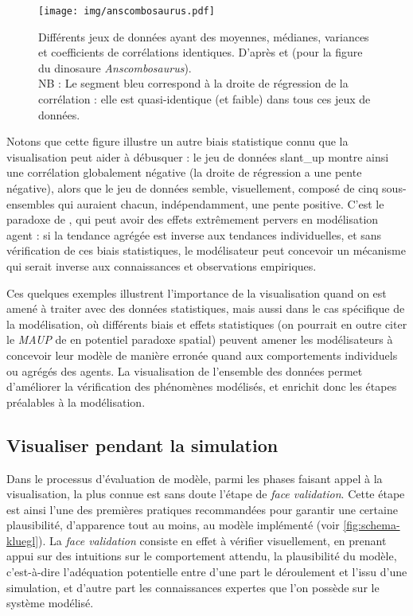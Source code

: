 \documentclass[a4paper, 12pt]{article}
\begin{document}
\begin{figure}[H]
	\centering
	\texttt{[image: img/anscombosaurus.pdf]}
	\caption{Différents jeux de données ayant des moyennes, médianes, variances et coefficients de corrélations identiques. D'après \textcite{matejka_same_2017} et \textcite{cairo_download_2016} (pour la figure du dinosaure \og \textit{Anscombosaurus}\fg{}).\\
	NB : Le segment bleu correspond à la droite de régression de la corrélation : elle est quasi-identique (et faible) dans tous ces jeux de données.}
	\label{fig:anscombosaurus}
\end{figure}

Notons que cette figure illustre un autre biais statistique connu que la visualisation peut aider à débusquer : le jeu de données \og \textsf{slant\_up}\fg{} montre ainsi une corrélation globalement négative (la droite de régression a une pente négative), alors que le jeu de données semble, visuellement, composé de cinq sous-ensembles qui auraient chacun, indépendamment, une pente positive.
C'est le paradoxe de \textcite{simpson_interpretation_1951}, qui peut avoir des effets extrêmement pervers en modélisation agent : si la tendance agrégée est inverse aux tendances individuelles, et sans vérification de ces biais statistiques, le modélisateur peut concevoir un mécanisme qui serait inverse aux connaissances et observations empiriques.

\bigskip
Ces quelques exemples illustrent l'importance de la visualisation quand on est amené à traiter avec des données statistiques, mais aussi dans le cas spécifique de la modélisation, où différents biais et effets statistiques (on pourrait en outre citer le \textit{MAUP} de \textcite{openshaw1984modifiable} en potentiel paradoxe spatial) peuvent amener les modélisateurs à concevoir leur modèle de manière erronée quand aux comportements individuels ou agrégés des agents.
La visualisation de l'ensemble des données permet d'améliorer la vérification des phénomènes modélisés, et enrichit donc les étapes préalables à la modélisation.


\subsection{Visualiser pendant la simulation\label{subsec:visualiser-pendant}}

Dans le processus d'évaluation de modèle, parmi les phases faisant appel à la visualisation, la plus connue est sans doute l'étape de \og \textit{face validation}.
Cette étape est ainsi l'une des premières pratiques recommandées pour garantir une certaine plausibilité, d'apparence tout au moins, au modèle implémenté (voir \cref{fig:schema-kluegl}).
La \textit{face validation} consiste en effet à vérifier visuellement, en prenant appui sur des intuitions sur le comportement attendu, la plausibilité du modèle, c'est-à-dire l'adéquation potentielle entre d'une part le déroulement et l'issu d'une simulation, et d'autre part les connaissances expertes que l'on possède sur le système modélisé.
\end{document}
